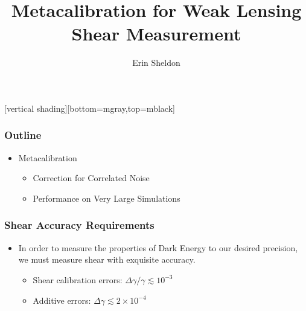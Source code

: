 \documentclass{beamer}
\title{Metacalibration for Weak Lensing Shear Measurement}
\author{Erin Sheldon}
\institute{Brookhaven National Laboratory\\LSST DESC Meeting at SLAC}
\begin{document}
\frame{\titlepage}


[vertical shading][bottom=mgray,top=mblack]

\frame
{
    \frametitle{Outline}

 
    \begin{itemize}

        \item Metacalibration

            \begin{itemize}
                \item Correction for Correlated Noise

                \item Performance on Very Large Simulations
            \end{itemize}

    \end{itemize}

}

\frame
{
    \frametitle{Shear Accuracy Requirements}

 
    \begin{itemize}

        \item In order to measure the properties of Dark Energy to our desired
            precision, we must measure shear with exquisite accuracy.

            \begin{itemize}
                \item Shear calibration errors: {\color{brightred} $\Delta \gamma/\gamma \lesssim 10^{-3}$}
                \item Additive errors: {\color{brightred} $\Delta \gamma \lesssim 2 \times 10^{-4}$}
            \end{itemize}
    \end{itemize}

}
\end{document}
